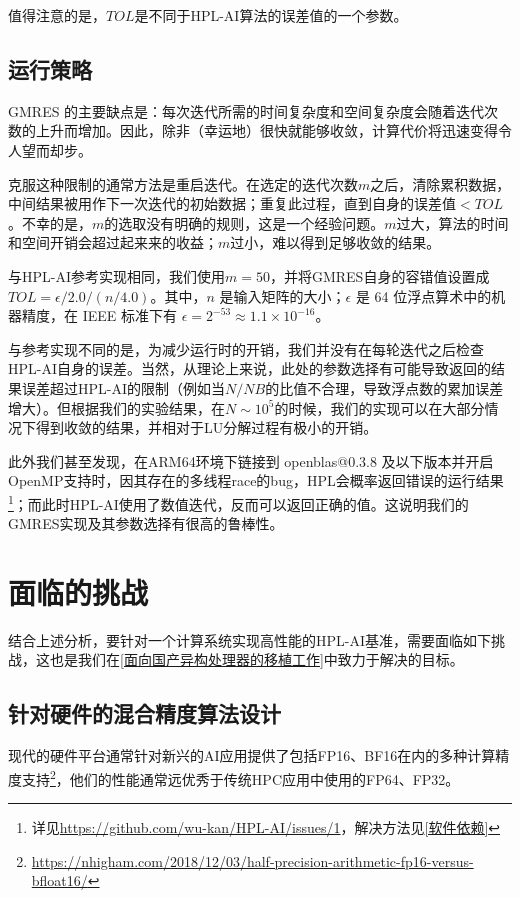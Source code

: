     值得注意的是，$\mathit{TOL}$是不同于HPL-AI算法的误差值的一个参数。

    \subsection{运行策略}
    \label{运行策略}

    GMRES 的主要缺点是：每次迭代所需的时间复杂度和空间复杂度会随着迭代次数的上升而增加。因此，除非（幸运地）很快就能够收敛，计算代价将迅速变得令人望而却步。

    克服这种限制的通常方法是重启迭代。在选定的迭代次数$m$之后，清除累积数据，中间结果被用作下一次迭代的初始数据；重复此过程，直到自身的误差值$<\mathit{TOL}$。不幸的是，$m$的选取没有明确的规则，这是一个经验问题。$m$过大，算法的时间和空间开销会超过起来来的收益；$m$过小，难以得到足够收敛的结果。

    与HPL-AI参考实现相同，我们使用$m=50$，并将GMRES自身的容错值设置成$\mathit{TOL}=\epsilon/2.0/(n/4.0)$。其中，$n$ 是输入矩阵的大小；$\epsilon$ 是 64 位浮点算术中的机器精度，在 IEEE 标准下有 $\epsilon=2^{−53}\approx 1.1\times 10^{-16}$。

    与参考实现不同的是，为减少运行时的开销，我们并没有在每轮迭代之后检查HPL-AI自身的误差。当然，从理论上来说，此处的参数选择有可能导致返回的结果误差超过HPL-AI的限制（例如当$N/\mathit{NB}$的比值不合理，导致浮点数的累加误差增大）。但根据我们的实验结果，在$N\sim 10^{5}$的时候，我们的实现可以在大部分情况下得到收敛的结果，并相对于LU分解过程有极小的开销。

此外我们甚至发现，在ARM64环境下链接到 openblas@0.3.8 及以下版本并开启OpenMP支持时，因其存在的多线程race的bug，HPL会概率返回错误的运行结果\footnote{详见\url{https://github.com/wu-kan/HPL-AI/issues/1}，解决方法见\autoref{软件依赖}}；而此时HPL-AI使用了数值迭代，反而可以返回正确的值。这说明我们的GMRES实现及其参数选择有很高的鲁棒性。

\section{面临的挑战}

结合上述分析，要针对一个计算系统实现高性能的HPL-AI基准，需要面临如下挑战，这也是我们在\autoref{面向国产异构处理器的移植工作}中致力于解决的目标。


\subsection{针对硬件的混合精度算法设计}

现代的硬件平台通常针对新兴的AI应用提供了包括FP16、BF16在内的多种计算精度支持\footnote{\url{https://nhigham.com/2018/12/03/half-precision-arithmetic-fp16-versus-bfloat16/}}，他们的性能通常远优秀于传统HPC应用中使用的FP64、FP32。

